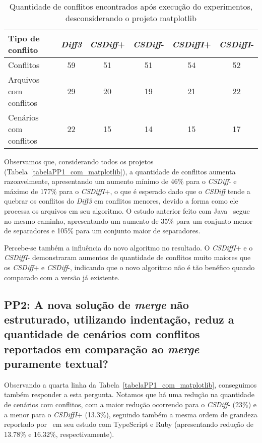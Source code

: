 \begin{table}[ht]
	\begin{center}
		\begin{tabular}{|l|c|c|c|c|c|}
			\hline
			\textbf{Tipo de conflito} & \textbf{\emph{Diff3}} & \textbf{\emph{CSDiff}+} & \textbf{\emph{CSDiff}-} & \textbf{\emph{CSDiffI}+} & \textbf{\emph{CSDiffI}-} \\
			\hline
			Conflitos                 & 59                    & 51                      & 51                      & 54                       & 52                       \\
			Arquivos com conflitos    & 29                    & 20                      & 19                      & 21                       & 22                       \\
			Cenários com conflitos    & 22                    & 15                      & 14                      & 15                       & 17                       \\
			\hline
		\end{tabular}
	\end{center}
	\caption{Quantidade de conflitos encontrados após execução do experimentos, desconsiderando o
		projeto matplotlib}\label{tabelaPP1_sem_matplotlib}
\end{table}

Observamos que, considerando todos os projetos (Tabela~\ref{tabelaPP1_com_matplotlib}), a quantidade de conflitos aumenta
razoavelmente, apresentando um aumento mínimo de 46\% para o \emph{CSDiff}- e máximo de 177\% para o \emph{CSDiffI}+, o que é esperado dado que o
\emph{CSDiff} tende a quebrar os conflitos do \emph{Diff3} em conflitos menores, devido a forma como ele processa os arquivos em seu algoritmo.
O estudo anterior feito com Java~\cite{clem21} segue no mesmo caminho, apresentando um aumento de 35\% para um conjunto menor de
separadores e 105\% para um conjunto maior de separadores.

Percebe-se também a influência do novo algoritmo no resultado. O \emph{CSDiffI}+ e o \emph{CSDiffI}- demonstraram aumentos de quantidade de
conflitos muito maiores que os \emph{CSDiff}+ e \emph{CSDiff}-, indicando que o novo algoritmo não é tão benéfico quando comparado com a
versão já existente.

\subsection{PP2: A nova solução de \emph{merge} não estruturado, utilizando indentação,
	reduz a quantidade de cenários com conflitos reportados em comparação ao \emph{merge} puramente textual?}\label{resultado_pp2}
Observando a quarta linha da Tabela~\ref{tabelaPP1_com_matplotlib}, conseguimos também responder a esta pergunta. Notamos
que há uma redução na quantidade de cenários com conflitos, com a maior redução ocorrendo para o \emph{CSDiff}- (23\%) e a menor para o
\emph{CSDiffI}+ (13.3\%), seguindo também a mesma ordem de grandeza reportado por~\cite{heitor21} em seu estudo com TypeScript
e Ruby (apresentando redução de 13.78\% e 16.32\%, respectivamente).

